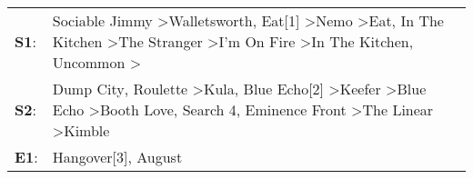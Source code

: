 \begin{supertabular}{p{0.03\textwidth}p{0.92\textwidth}}
 \textbf{S1}:  &  Sociable Jimmy\textsuperscript{} \textgreater \enspace Walletsworth\textsuperscript{}, \enspace Eat[1]\textsuperscript{} \textgreater \enspace Nemo\textsuperscript{} \textgreater \enspace Eat\textsuperscript{}, \enspace In The Kitchen\textsuperscript{} \textgreater \enspace The Stranger\textsuperscript{} \textgreater \enspace I'm On Fire\textsuperscript{} \textgreater \enspace In The Kitchen\textsuperscript{}, \enspace Uncommon\textsuperscript{} \textgreater {}\textsuperscript{}  \enspace  \\
 \textbf{S2}:  &                    Dump City\textsuperscript{}, \enspace Roulette\textsuperscript{} \textgreater \enspace Kula\textsuperscript{}, \enspace Blue Echo[2]\textsuperscript{} \textgreater \enspace Keefer\textsuperscript{} \textgreater \enspace Blue Echo\textsuperscript{} \textgreater \enspace Booth Love\textsuperscript{}, \enspace Search 4\textsuperscript{}, \enspace Eminence Front\textsuperscript{} \textgreater \enspace The Linear\textsuperscript{} \textgreater \enspace Kimble\textsuperscript{}  \enspace  \\
 \textbf{E1}:  &                                                                                                                                                                                                                                                                                                                                                                                                                                                Hangover[3]\textsuperscript{}, \enspace August\textsuperscript{}  \enspace  \\
\end{supertabular}
